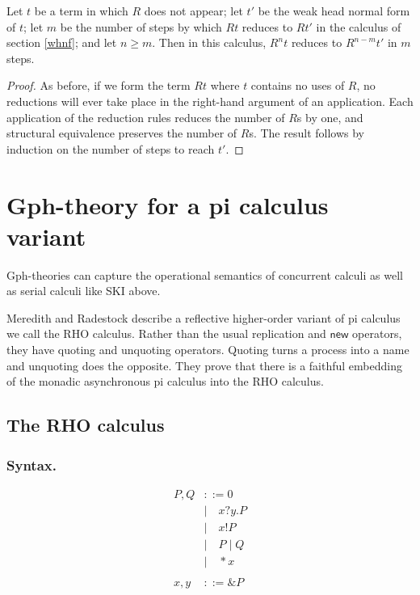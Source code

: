 \documentclass[a4paper,UKenglish]{lipics-v2016}
\newcommand{\new}{\mathsf{new}}
\begin{document}
\begin{theorem}
  Let $t$ be a term in which $R$ does not appear; let $t'$ be the weak head normal form of $t$; let $m$ be the number of steps by which $Rt$ reduces to $Rt'$ in the calculus of section \ref{whnf}; and let $n\ge m$.  Then in this calculus, $R^n t$ reduces to $R^{n-m}t'$ in $m$ steps.
\end{theorem}

\begin{proof}
As before, if we form the term $Rt$ where $t$ contains no uses of $R$, no reductions will ever take place in the right-hand argument of an application.  Each application of the reduction rules reduces the number of $R$s by one, and structural equivalence preserves the number of $R$s.  The result follows by induction on the number of steps to reach $t'.$
\end{proof}

\section{Gph-theory for a pi calculus variant}
\label{rhocomb}
Gph-theories can capture the operational semantics of concurrent calculi as well as serial calculi like SKI above.

  Meredith and Radestock \cite{DBLP:journals/entcs/MeredithR05} describe a reflective higher-order variant of pi calculus we call the RHO calculus.  Rather than the usual replication and $\new$ operators, they have quoting and unquoting operators.  Quoting turns a process into a name and unquoting does the opposite.  They prove that there is a faithful embedding of the monadic asynchronous pi calculus into the RHO calculus.

\subsection{The RHO calculus}
\subsubsection{Syntax.}
\[\begin{array}{rl}
  P, Q &::= 0 \\ 
  &| \quad x?y.P \\ 
  &| \quad x!P \\ 
  &| \quad P \;|\; Q \\
  &| \quad *x \\ 
  &\\
  x, y &::= \&P \\ 
\end{array}\]
\end{document}
